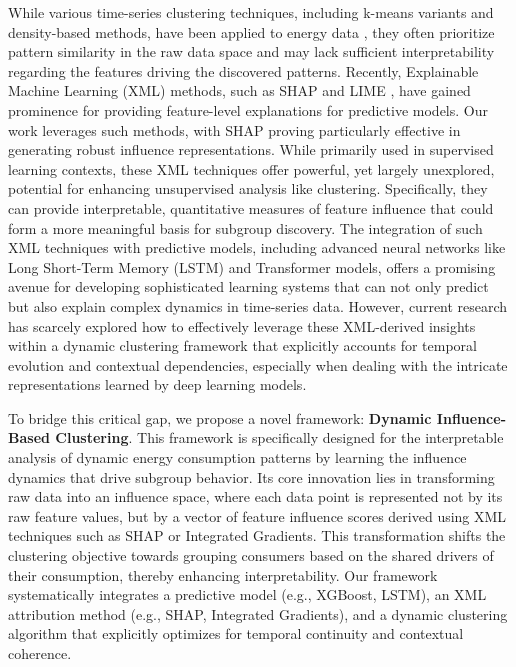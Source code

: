 \documentclass[final,authoryear,3p,times,review,sort&compress]{elsarticle}
\begin{document}
While various time-series clustering techniques, including k-means variants and density-based methods, have been applied to energy data \citep{yerbury2025comparing,michalakopoulos2024machine}, they often prioritize pattern similarity in the raw data space and may lack sufficient interpretability regarding the features driving the discovered patterns. Recently, Explainable Machine Learning (XML) methods, such as SHAP \citep{bialek2022dataset} and LIME \citep{wang2025tf}, have gained prominence for providing feature-level explanations for predictive models. Our work leverages such methods, with SHAP proving particularly effective in generating robust influence representations. While primarily used in supervised learning contexts, these XML techniques offer powerful, yet largely unexplored, potential for enhancing unsupervised analysis like clustering. Specifically, they can provide interpretable, quantitative measures of feature influence that could form a more meaningful basis for subgroup discovery. The integration of such XML techniques with predictive models, including advanced neural networks like Long Short-Term Memory (LSTM) and Transformer models, offers a promising avenue for developing sophisticated learning systems that can not only predict but also explain complex dynamics in time-series data. However, current research has scarcely explored how to effectively leverage these XML-derived insights within a dynamic clustering framework that explicitly accounts for temporal evolution and contextual dependencies, especially when dealing with the intricate representations learned by deep learning models.

To bridge this critical gap, we propose a novel framework: \textbf{Dynamic Influence-Based Clustering}. This framework is specifically designed for the interpretable analysis of dynamic energy consumption patterns by learning the influence dynamics that drive subgroup behavior. Its core innovation lies in transforming raw data into an influence space, where each data point is represented not by its raw feature values, but by a vector of feature influence scores derived using XML techniques such as SHAP or Integrated Gradients. This transformation shifts the clustering objective towards grouping consumers based on the shared drivers of their consumption, thereby enhancing interpretability. Our framework systematically integrates a predictive model (e.g., XGBoost, LSTM), an XML attribution method (e.g., SHAP, Integrated Gradients), and a dynamic clustering algorithm that explicitly optimizes for temporal continuity and contextual coherence.
\end{document}
